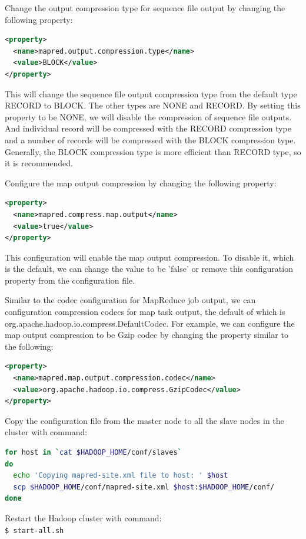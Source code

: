 Change the output compression type for sequence file output by changing the following property:
\lstset{style=bashstyle}
\begin{lstlisting}[language=XML]
<property>
  <name>mapred.output.compression.type</name>
  <value>BLOCK</value>
</property>
\end{lstlisting}
This will change the sequence file output compression type from the default type RECORD to BLOCK. The other types are NONE and RECORD. By setting this property to be NONE, we will disable the compression of sequence file outputs. And individual record will be compressed with the RECORD compression type and a number of records will be compressed with the BLOCK compression type. Generally, the BLOCK compression type is more efficient than RECORD type, so it is recommended.

Configure the map output compression by changing the following property:
\lstset{style=bashstyle}
\begin{lstlisting}[language=XML]
<property>
  <name>mapred.compress.map.output</name>
  <value>true</value>
</property>
\end{lstlisting}
This configuration will enable the map output compression. To disable it, which is the default, we can change the value to be 'false' or remove this configuration property from the configuration file.


Similar to the codec configuration for MapReduce job output, we can configuration compression codecs for map task output, the default of which is org.apache.hadoop.io.compress.DefaultCodec. For example, we can configure the map output compression to be Gzip codec by changing the property similar to the following:
\lstset{style=bashstyle}
\begin{lstlisting}[language=XML]
<property>
  <name>mapred.map.output.compression.codec</name>
  <value>org.apache.hadoop.io.compress.GzipCodec</value>
</property>
\end{lstlisting}

Copy the configuration file from the master node to all the slave nodes in the cluster with command:
\lstset{style=bashstyle}
\begin{lstlisting}[language=bash]
for host in `cat $HADOOP_HOME/conf/slaves`
do
  echo 'Copying mapred-site.xml file to host: ' $host
  scp $HADOOP_HOME/conf/mapred-site.xml $host:$HADOOP_HOME/conf/
done
\end{lstlisting}

Restart the Hadoop cluster with command: \\
\verb|$ start-all.sh|

